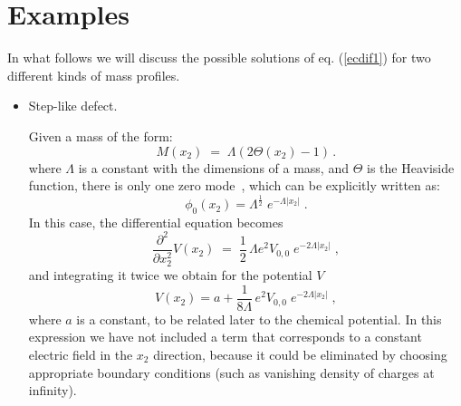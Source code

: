 \documentclass[a4paper,12pt]{article}
\begin{document}
{{\section{Examples}\label{examples}
In what follows we will discuss the possible solutions of eq.
(\ref{ecdif1}) for two different kinds of mass profiles.
\begin{itemize}
\item Step-like defect.
 
 Given a mass of the form:
\begin{equation}
M(x_2)\;=\;\Lambda (2\Theta (x_2)-1)\,.
\end{equation}
where $\Lambda$ is a constant with the dimensions of a mass, and
$\Theta$ is the Heaviside function, there is only one zero
mode~\cite{p1}, which can be explicitly written as:
\begin{equation}
\phi_0(x_2)=\Lambda^{\frac{1}{2}}\;e^{-\Lambda|x_2|}\;.
\end{equation}
In this case, the differential equation becomes
\begin{equation}
   \label{eq:g1}
\frac{\partial^2}{\partial x_2^2}V(x_2)\;=\;\frac{1}{2} \, \Lambda
e^2 V_{0,0}\; e^{-2\Lambda|x_2|}\;,
\end{equation}
and integrating it twice we obtain for the potential $V$
\begin{equation}
\label{vx2}
V(x_2)=a+\frac{1}{8 \Lambda}\, e^2 V_{0,0}\; e^{-2\Lambda|x_2|}\;,
\end{equation}
where $a$ is a constant, to be related later to the chemical
potential.  In this expression we have not included a term that
corresponds to a constant electric field in the $x_2$ direction,
because it could be eliminated by choosing appropriate boundary
conditions (such as vanishing density of charges at infinity).


\end{itemize}}}
\end{document}
